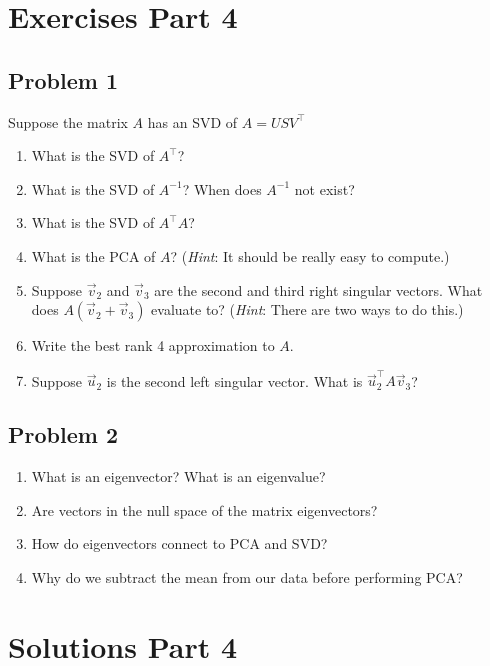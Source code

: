 \documentclass[11pt]{article}
\begin{document}
\clearpage

\section*{Exercises Part 4}
\subsection*{Problem 1}
Suppose the matrix $A$ has an SVD of $A=USV^\top$
\begin{enumerate}
    \item[(a)] What is the SVD of $A^\top$?
    \item[(b)] What is the SVD of $A^{-1}$? When does $A^{-1}$ not exist?
    \item[(c)] What is the SVD of $A^\top A$?
    \item[(d)] What is the PCA of $A$? (\textit{Hint}: It should be really easy to compute.)
    \item[(e)] Suppose $\vec{v}_2$ and $\vec{v}_3$ are the second and third right singular vectors. What does $A\left(\vec{v}_2+\vec{v}_3\right)$ evaluate to? (\textit{Hint}: There are two ways to do this.)
    \item[(f)] Write the best rank 4 approximation to $A$.
    \item[(g)] Suppose $\vec{u}_2$ is the second left singular vector. What is $\vec{u}^\top_2A\vec{v}_3$?
\end{enumerate}

\subsection*{Problem 2}
\begin{enumerate}
    \item[(a)] What is an eigenvector? What is an eigenvalue?
    \item[(b)] Are vectors in the null space of the matrix eigenvectors?
    \item[(c)] How do eigenvectors connect to PCA and SVD?
    \item[(d)] Why do we subtract the mean from our data before performing PCA?
\end{enumerate}

\clearpage

\section*{Solutions Part 4}
\end{document}
